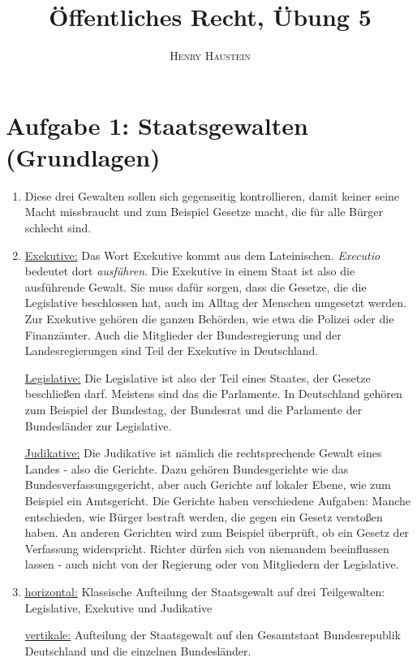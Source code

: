 \documentclass{article}
\title{\textbf{Öffentliches Recht, Übung 5}}
\author{\textsc{Henry Haustein}}
\date{}
\begin{document}
	\maketitle
	
	\section*{Aufgabe 1: Staatsgewalten (Grundlagen)}
	\begin{enumerate}[label=(\alph*)]
		\item Diese drei Gewalten sollen sich gegenseitig kontrollieren, damit keiner seine Macht missbraucht und zum Beispiel Gesetze macht, die für alle Bürger schlecht sind.
		\item \underline{Exekutive:} Das Wort Exekutive kommt aus dem Lateinischen. \textit{Executio} bedeutet dort \textit{ausführen}. Die Exekutive in einem Staat ist also die ausführende Gewalt. Sie muss dafür sorgen, dass die Gesetze, die die Legislative beschlossen hat, auch im Alltag der Menschen umgesetzt werden. Zur Exekutive gehören die ganzen Behörden, wie etwa die Polizei oder die Finanzämter. Auch die Mitglieder der Bundesregierung und der Landesregierungen sind Teil der Exekutive in Deutschland.
		
		\underline{Legislative:} Die Legislative ist also der Teil eines Staates, der Gesetze beschließen darf. Meistens sind das die Parlamente. In Deutschland gehören zum Beispiel der Bundestag, der Bundesrat und die Parlamente der Bundesländer zur Legislative.
		
		\underline{Judikative:} Die Judikative ist nämlich die rechtsprechende Gewalt eines Landes - also die Gerichte. Dazu gehören Bundesgerichte wie das Bundesverfassungsgericht, aber auch Gerichte auf lokaler Ebene, wie zum Beispiel ein Amtsgericht. Die Gerichte haben verschiedene Aufgaben: Manche entschieden, wie Bürger bestraft werden, die gegen ein Gesetz verstoßen haben. An anderen Gerichten wird zum Beispiel überprüft, ob ein Gesetz der Verfassung widerspricht. Richter dürfen sich von niemandem beeinflussen lassen - auch nicht von der Regierung oder von Mitgliedern der Legislative.
		\item \underline{horizontal:} Klassische Aufteilung der Staatsgewalt auf drei Teilgewalten: Legislative, Exekutive und Judikative
		
		\underline{vertikale:} Aufteilung der Staatsgewalt auf den Gesamtstaat Bundesrepublik Deutschland und die einzelnen Bundesländer.
	\end{enumerate}
\end{document}
